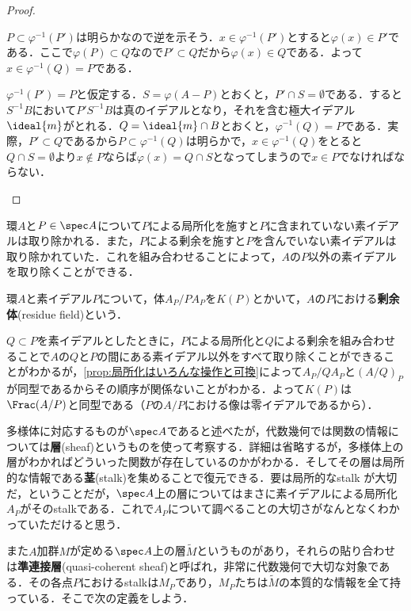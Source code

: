 \begin{proof}
	\begin{eqv}
		\item $P\subset\varphi^{-1}(P')$は明らかなので逆を示そう．$x\in\varphi^{-1}(P')$とすると$\varphi(x)\in P'$である．ここで$\varphi(P)\subset Q$なので$P'\subset Q$だから$\varphi(x)\in Q$である．よって$x\in\varphi^{-1}(Q)=P$である．
		
		\item 	$\varphi^{-1}(P')=P$と仮定する．$S=\varphi(A-P)$とおくと，$P'\cap S=\emptyset$である．すると$S^{-1}B$において$P'S^{-1}B$は真のイデアルとなり，それを含む極大イデアル$\ideal{m}$がとれる．$Q=\ideal{m}\cap B$とおくと，$\varphi^{-1}(Q)=P$である．実際，$P'\subset Q$であるから$P\subset\varphi^{-1}(Q)$は明らかで，$x\in\varphi^{-1}(Q)$をとると$Q\cap S=\emptyset$より$x\not\in P$ならば$\varphi(x)=Q\cap S$となってしまうので$x\in P$でなければならない．
	\end{eqv}
\end{proof}

環$A$と$P\in\spec A$について$P$による局所化を施すと$P$に含まれていない素イデアルは取り除かれる．また，$P$による剰余を施すと$P$を含んでいない素イデアルは取り除かれていた．これを組み合わせることによって，$A$の$P$以外の素イデアルを取り除くことができる．
\begin{defi}[剰余体]
	環$A$と素イデアル$P$について，体$A_P/PA_P$を$K(P)$とかいて，$A$の$P$における\textbf{剰余体}(residue field)という．
\end{defi}

$Q\subset P$を素イデアルとしたときに，$P$による局所化と$Q$による剰余を組み合わせることで$A$の$Q$と$P$の間にある素イデアル以外をすべて取り除くことができることがわかるが，\ref{prop:局所化はいろんな操作と可換}によって$A_P/QA_P$と$(A/Q)_P$が同型であるからその順序が関係ないことがわかる．よって$K(P)$は$\Frac (A/P)$と同型である（$P$の$A/P$における像は零イデアルであるから）．

\begin{tightcurve}
	多様体に対応するものが$\spec A$であると述べたが，代数幾何では関数の情報については\textbf{層}(sheaf)というものを使って考察する．詳細は省略するが，多様体上の層がわかればどういった関数が存在しているのかがわかる．そしてその層は局所的な情報である\textbf{茎}(stalk)を集めることで復元できる．要は局所的なstalk が大切だ，ということだが，$\spec A$上の層についてはまさに素イデアルによる局所化$A_P$がそのstalkである．これで$A_P$について調べることの大切さがなんとなくわかっていただけると思う．
	
	また$A$加群$M$が定める$\spec A$上の層$\widetilde{M}$というものがあり，それらの貼り合わせは\textbf{準連接層}(quasi-coherent sheaf)と呼ばれ，非常に代数幾何で大切な対象である．その各点$P$におけるstalkは$M_P$であり，$M_P$たちは$\widetilde{M}$の本質的な情報を全て持っている．そこで次の定義をしよう．
\end{tightcurve}

